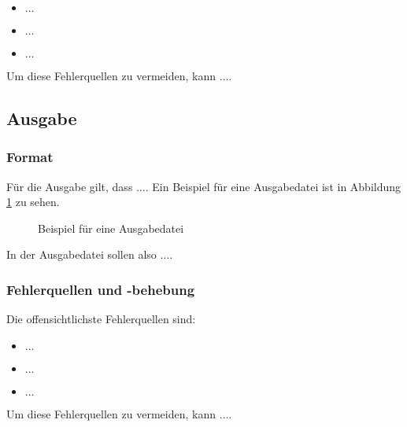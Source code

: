 \begin{itemize}
    \item $\ldots$
    \item $\ldots$
    \item $\ldots$
\end{itemize}

Um diese Fehlerquellen zu vermeiden, kann $\ldots$.

\subsection{Ausgabe}
\label{ssec:ausgabe}


\subsubsection{Format}
\label{sssec:format}

Für die Ausgabe gilt, dass $\ldots$.
Ein Beispiel für eine Ausgabedatei ist in Abbildung \ref{fig:example_output} zu sehen.

\begin{figure}[H]
    \centering
    
    \caption{Beispiel für eine Ausgabedatei}
    \label{fig:example_output}
\end{figure}

In der Ausgabedatei sollen also $\ldots$.

\subsubsection{Fehlerquellen und -behebung}
\label{sssec:fehlerquellen_und_-behebung}

Die offensichtlichste Fehlerquellen sind:

\begin{itemize}
    \item $\ldots$
    \item $\ldots$
    \item $\ldots$
\end{itemize}

Um diese Fehlerquellen zu vermeiden, kann $\ldots$.